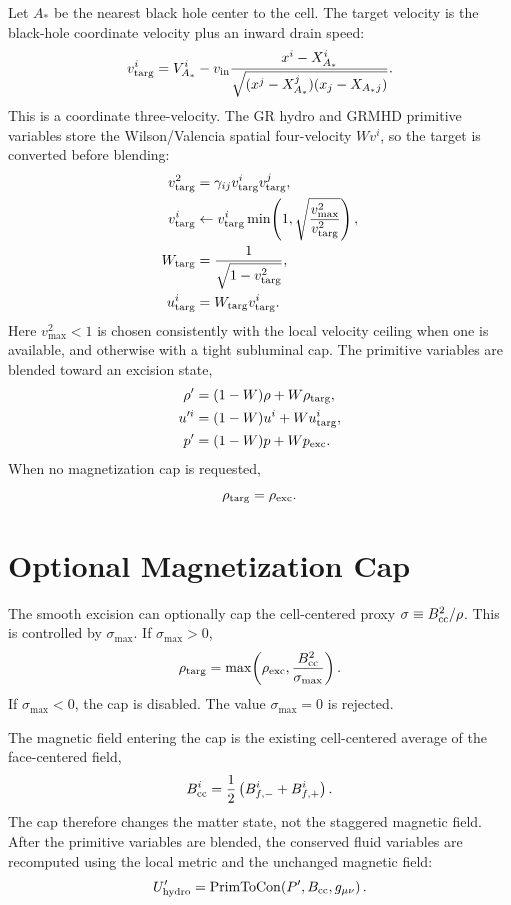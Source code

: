 \documentclass[11pt]{article}
\begin{document}
Let \(A_\ast\) be the nearest black hole center to the cell.  The target
velocity is the black-hole coordinate velocity plus an inward drain speed:
\begin{equation}
  v_{\rm targ}^i
  =
  V_{A_\ast}^i
  -
  v_{\rm in}
  \frac{x^i - X_{A_\ast}^i}
       {\sqrt{(x^j-X_{A_\ast}^j)(x_j-X_{A_\ast j})}} .
\end{equation}
This is a coordinate three-velocity.  The GR hydro and GRMHD primitive
variables store the Wilson/Valencia spatial four-velocity \(Wv^i\), so the
target is converted before blending:
\begin{align}
  v_{\rm targ}^2 &= \gamma_{ij}v_{\rm targ}^i v_{\rm targ}^j,\\
  v_{\rm targ}^i &\leftarrow
  v_{\rm targ}^i
  \min\!\left(1,\sqrt{\frac{v_{\max}^2}{v_{\rm targ}^2}}\right),\\
  W_{\rm targ} &= \frac{1}{\sqrt{1-v_{\rm targ}^2}},\\
  u_{\rm targ}^i &= W_{\rm targ}v_{\rm targ}^i .
\end{align}
Here \(v_{\max}^2 < 1\) is chosen consistently with the local velocity
ceiling when one is available, and otherwise with a tight subluminal cap.
The primitive variables are blended toward an excision state,
\begin{align}
  \rho' &= (1-W)\rho + W\rho_{\rm targ},\\
  u'^i &= (1-W)u^i + Wu_{\rm targ}^i,\\
  p' &= (1-W)p + Wp_{\rm exc}.
\end{align}
When no magnetization cap is requested,
\begin{equation}
  \rho_{\rm targ} = \rho_{\rm exc}.
\end{equation}

\section{Optional Magnetization Cap}

The smooth excision can optionally cap the cell-centered proxy
\(\sigma \equiv B_{\rm cc}^2/\rho\).  This is controlled by
\(\sigma_{\max}\).  If \(\sigma_{\max}>0\),
\begin{equation}
  \rho_{\rm targ}
  =
  \max\!\left(
    \rho_{\rm exc},
    \frac{B_{\rm cc}^2}{\sigma_{\max}}
  \right).
\end{equation}
If \(\sigma_{\max}<0\), the cap is disabled.  The value
\(\sigma_{\max}=0\) is rejected.

The magnetic field entering the cap is the existing cell-centered average of
the face-centered field,
\begin{equation}
  B_{\rm cc}^i =
  \frac{1}{2}\left(B^i_{f,-} + B^i_{f,+}\right).
\end{equation}
The cap therefore changes the matter state, not the staggered magnetic
field.  After the primitive variables are blended, the conserved fluid
variables are recomputed using the local metric and the unchanged magnetic
field:
\begin{equation}
  U'_{\rm hydro} =
  {\rm PrimToCon}\!\left(P', B_{\rm cc}, g_{\mu\nu}\right).
\end{equation}
\end{document}
